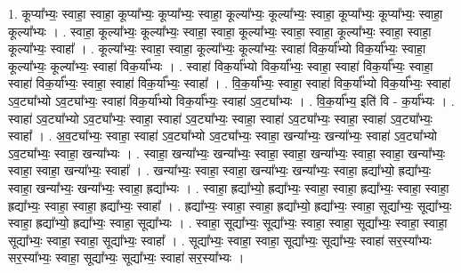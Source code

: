 \documentclass[17pt]{extarticle}
\begin{document}
1. कूप्या᳚भ्यः॒ स्वाहा॒ स्वाहा॒ कूप्या᳚भ्यः॒ कूप्या᳚भ्यः॒ स्वाहा॒ कूल्या᳚भ्यः॒ कूल्या᳚भ्यः॒ स्वाहा॒ कूप्या᳚भ्यः॒ कूप्या᳚भ्यः॒ स्वाहा॒ कूल्या᳚भ्यः । . स्वाहा॒ कूल्या᳚भ्यः॒ कूल्या᳚भ्यः॒ स्वाहा॒ स्वाहा॒ कूल्या᳚भ्यः॒ स्वाहा॒ स्वाहा॒ कूल्या᳚भ्यः॒ स्वाहा॒ स्वाहा॒ कूल्या᳚भ्यः॒ स्वाहा᳚ । . कूल्या᳚भ्यः॒ स्वाहा॒ स्वाहा॒ कूल्या᳚भ्यः॒ कूल्या᳚भ्यः॒ स्वाहा॑ विक॒र्या᳚भ्यो विक॒र्या᳚भ्यः॒ स्वाहा॒ कूल्या᳚भ्यः॒ कूल्या᳚भ्यः॒ स्वाहा॑ विक॒र्या᳚भ्यः । . स्वाहा॑ विक॒र्या᳚भ्यो विक॒र्या᳚भ्यः॒ स्वाहा॒ स्वाहा॑ विक॒र्या᳚भ्यः॒ स्वाहा॒ स्वाहा॑ विक॒र्या᳚भ्यः॒ स्वाहा॒ स्वाहा॑ विक॒र्या᳚भ्यः॒ स्वाहा᳚ । . वि॒क॒र्या᳚भ्यः॒ स्वाहा॒ स्वाहा॑ विक॒र्या᳚भ्यो विक॒र्या᳚भ्यः॒ स्वाहा॑ ऽव॒ट्या᳚भ्यो ऽव॒ट्या᳚भ्यः॒ स्वाहा॑ विक॒र्या᳚भ्यो विक॒र्या᳚भ्यः॒ स्वाहा॑ ऽव॒ट्या᳚भ्यः । . वि॒क॒र्या᳚भ्य॒ इति॑ वि - क॒र्या᳚भ्यः । . स्वाहा॑ ऽव॒ट्या᳚भ्यो ऽव॒ट्या᳚भ्यः॒ स्वाहा॒ स्वाहा॑ ऽव॒ट्या᳚भ्यः॒ स्वाहा॒ स्वाहा॑ ऽव॒ट्या᳚भ्यः॒ स्वाहा॒ स्वाहा॑ ऽव॒ट्या᳚भ्यः॒ स्वाहा᳚ । . अ॒व॒ट्या᳚भ्यः॒ स्वाहा॒ स्वाहा॑ ऽव॒ट्या᳚भ्यो ऽव॒ट्या᳚भ्यः॒ स्वाहा॒ खन्या᳚भ्यः॒ खन्या᳚भ्यः॒ स्वाहा॑ ऽव॒ट्या᳚भ्यो ऽव॒ट्या᳚भ्यः॒ स्वाहा॒ खन्या᳚भ्यः । . स्वाहा॒ खन्या᳚भ्यः॒ खन्या᳚भ्यः॒ स्वाहा॒ स्वाहा॒ खन्या᳚भ्यः॒ स्वाहा॒ स्वाहा॒ खन्या᳚भ्यः॒ स्वाहा॒ स्वाहा॒ खन्या᳚भ्यः॒ स्वाहा᳚ । . खन्या᳚भ्यः॒ स्वाहा॒ स्वाहा॒ खन्या᳚भ्यः॒ खन्या᳚भ्यः॒ स्वाहा॒ ह्रद्या᳚भ्यो॒ ह्रद्या᳚भ्यः॒ स्वाहा॒ खन्या᳚भ्यः॒ खन्या᳚भ्यः॒ स्वाहा॒ ह्रद्या᳚भ्यः । . स्वाहा॒ ह्रद्या᳚भ्यो॒ ह्रद्या᳚भ्यः॒ स्वाहा॒ स्वाहा॒ ह्रद्या᳚भ्यः॒ स्वाहा॒ स्वाहा॒ ह्रद्या᳚भ्यः॒ स्वाहा॒ स्वाहा॒ ह्रद्या᳚भ्यः॒ स्वाहा᳚ । . ह्रद्या᳚भ्यः॒ स्वाहा॒ स्वाहा॒ ह्रद्या᳚भ्यो॒ ह्रद्या᳚भ्यः॒ स्वाहा॒ सूद्या᳚भ्यः॒ सूद्या᳚भ्यः॒ स्वाहा॒ ह्रद्या᳚भ्यो॒ ह्रद्या᳚भ्यः॒ स्वाहा॒ सूद्या᳚भ्यः । . स्वाहा॒ सूद्या᳚भ्यः॒ सूद्या᳚भ्यः॒ स्वाहा॒ स्वाहा॒ सूद्या᳚भ्यः॒ स्वाहा॒ स्वाहा॒ सूद्या᳚भ्यः॒ स्वाहा॒ स्वाहा॒ सूद्या᳚भ्यः॒ स्वाहा᳚ । . सूद्या᳚भ्यः॒ स्वाहा॒ स्वाहा॒ सूद्या᳚भ्यः॒ सूद्या᳚भ्यः॒ स्वाहा॑ सर॒स्या᳚भ्यः सर॒स्या᳚भ्यः॒ स्वाहा॒ सूद्या᳚भ्यः॒ सूद्या᳚भ्यः॒ स्वाहा॑ सर॒स्या᳚भ्यः । \newline
\end{document}

